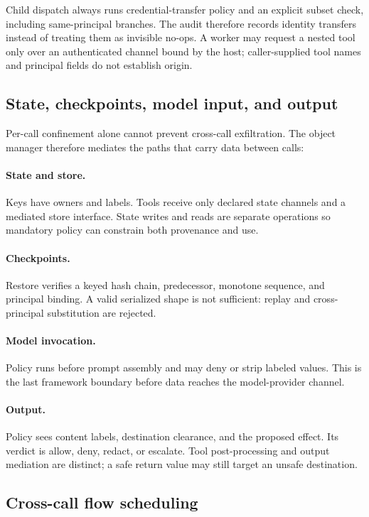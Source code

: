\documentclass[letterpaper,twocolumn,10pt]{article}
\begin{document}
Child dispatch always runs credential-transfer policy and an explicit subset
check, including same-principal branches. The audit therefore records identity
transfers instead of treating them as invisible no-ops. A worker may request a
nested tool only over an authenticated channel bound by the host; caller-supplied
tool names and principal fields do not establish origin.

\subsection{State, checkpoints, model input, and output}

Per-call confinement alone cannot prevent cross-call exfiltration. The object
manager therefore mediates the paths that carry data between calls:

\paragraph{State and store.}
Keys have owners and labels. Tools receive only declared state channels and a
mediated store interface. State writes and reads are separate operations so
mandatory policy can constrain both provenance and use.

\paragraph{Checkpoints.}
Restore verifies a keyed hash chain, predecessor, monotone sequence, and
principal binding. A valid serialized shape is not sufficient: replay and
cross-principal substitution are rejected.

\paragraph{Model invocation.}
Policy runs before prompt assembly and may deny or strip labeled values. This is
the last framework boundary before data reaches the model-provider channel.

\paragraph{Output.}
Policy sees content labels, destination clearance, and the proposed effect. Its
verdict is allow, deny, redact, or escalate. Tool post-processing and output
mediation are distinct; a safe return value may still target an unsafe
destination.

\subsection{Cross-call flow scheduling}
\end{document}
